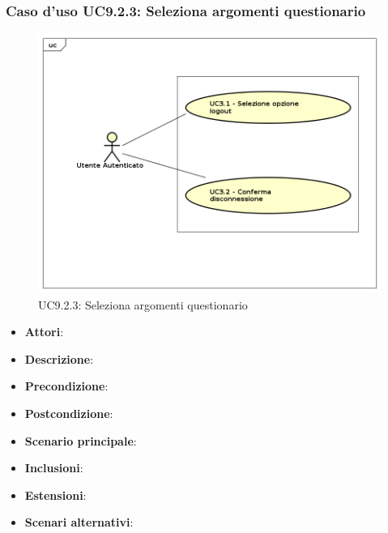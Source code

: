 		\subsubsection{Caso d'uso UC9.2.3: Seleziona argomenti questionario}
		\label{UC9.2.3}
		\begin{figure}[h]
			\centering
		\includegraphics[scale=0.7,keepaspectratio]{UML/UC9.png}
			\caption{UC9.2.3: Seleziona argomenti questionario}
		\end{figure}
		\FloatBarrier
		\begin{itemize}
			\item \textbf{Attori}: 
			\item \textbf{Descrizione}: 
			\item \textbf{Precondizione}: 
			\item \textbf{Postcondizione}: 
			\item \textbf{Scenario principale}:
			\item \textbf{Inclusioni}:
			\item \textbf{Estensioni}:
			\item \textbf{Scenari alternativi}:
		\end{itemize}
		
